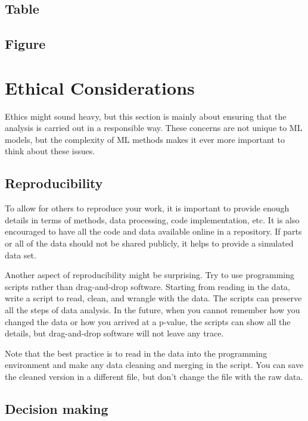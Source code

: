\documentclass[
]{book}
\begin{document}
\hypertarget{table}{%
\section{Table}\label{table}}

\hypertarget{figure}{%
\section{Figure}\label{figure}}

\hypertarget{ethical-considerations}{%
\chapter{Ethical Considerations}\label{ethical-considerations}}

Ethics might sound heavy, but this section is mainly about ensuring that the analysis is carried out in a responsible way. These concerns are not unique to ML models, but the complexity of ML methods makes it ever more important to think about these issues.

\hypertarget{reproducibility}{%
\section{Reproducibility}\label{reproducibility}}

To allow for others to reproduce your work, it is important to provide enough details in terms of methods, data processing, code implementation, etc. It is also encouraged to have all the code and data available online in a repository. If parts or all of the data should not be shared publicly, it helps to provide a simulated data set.

Another aspect of reproducibility might be surprising. Try to use programming scripts rather than drag-and-drop software. Starting from reading in the data, write a script to read, clean, and wrangle with the data. The scripts can preserve all the steps of data analysis. In the future, when you cannot remember how you changed the data or how you arrived at a p-value, the scripts can show all the details, but drag-and-drop software will not leave any trace.

Note that the best practice is to read in the data into the programming environment and make any data cleaning and merging in the script. You can save the cleaned version in a different file, but don't change the file with the raw data.

\hypertarget{decision-making}{%
\section{Decision making}\label{decision-making}}
\end{document}
